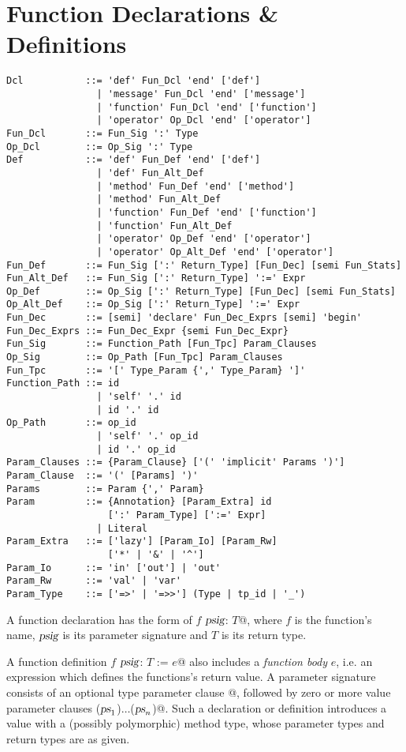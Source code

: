 \section{Function Declarations \& Definitions}
\label{sec:function-decls-defs}

\syntax\begin{lstlisting}
Dcl           ::= 'def' Fun_Dcl 'end' ['def']
                | 'message' Fun_Dcl 'end' ['message']
                | 'function' Fun_Dcl 'end' ['function']
                | 'operator' Op_Dcl 'end' ['operator']
Fun_Dcl       ::= Fun_Sig ':' Type
Op_Dcl        ::= Op_Sig ':' Type
Def           ::= 'def' Fun_Def 'end' ['def']
                | 'def' Fun_Alt_Def
                | 'method' Fun_Def 'end' ['method']
                | 'method' Fun_Alt_Def
                | 'function' Fun_Def 'end' ['function']
                | 'function' Fun_Alt_Def
                | 'operator' Op_Def 'end' ['operator']
                | 'operator' Op_Alt_Def 'end' ['operator']
Fun_Def       ::= Fun_Sig [':' Return_Type] [Fun_Dec] [semi Fun_Stats]
Fun_Alt_Def   ::= Fun_Sig [':' Return_Type] ':=' Expr
Op_Def        ::= Op_Sig [':' Return_Type] [Fun_Dec] [semi Fun_Stats]
Op_Alt_Def    ::= Op_Sig [':' Return_Type] ':=' Expr
Fun_Dec       ::= [semi] 'declare' Fun_Dec_Exprs [semi] 'begin'
Fun_Dec_Exprs ::= Fun_Dec_Expr {semi Fun_Dec_Expr}
Fun_Sig       ::= Function_Path [Fun_Tpc] Param_Clauses
Op_Sig        ::= Op_Path [Fun_Tpc] Param_Clauses
Fun_Tpc       ::= '[' Type_Param {',' Type_Param} ']'
Function_Path ::= id
                | 'self' '.' id
                | id '.' id
Op_Path       ::= op_id
                | 'self' '.' op_id
                | id '.' op_id
Param_Clauses ::= {Param_Clause} ['(' 'implicit' Params ')']
Param_Clause  ::= '(' [Params] ')'
Params        ::= Param {',' Param}
Param         ::= {Annotation} [Param_Extra] id 
                  [':' Param_Type] [':=' Expr]
                | Literal
Param_Extra   ::= ['lazy'] [Param_Io] [Param_Rw] 
                  ['*' | '&' | '^']
Param_Io      ::= 'in' ['out'] | 'out'
Param_Rw      ::= 'val' | 'var'
Param_Type    ::= ['=>' | '=>>'] (Type | tp_id | '_')
\end{lstlisting}


A function declaration has the form of \lstinline@def $f$ $\mbox{\sl psig}$: $T$@, where $f$ is the function's name, $\mbox{\sl psig}$ is its parameter signature and $T$ is its return type. 

A function definition \lstinline@def $f$ $\mbox{\sl psig}$: $T$ := $e$@ also includes a {\em function body} $e$, i.e. an expression which defines the functions's return value. A parameter signature consists of an optional type parameter clause \lstinline@[$\tps$]@, followed by zero or more value parameter clauses \lstinline@($\mbox{\sl ps}_1$)$\ldots$($\mbox{\sl ps}_n$)@. Such a declaration or definition introduces a value with a (possibly polymorphic) method type, whose parameter types and return types are as given. 

